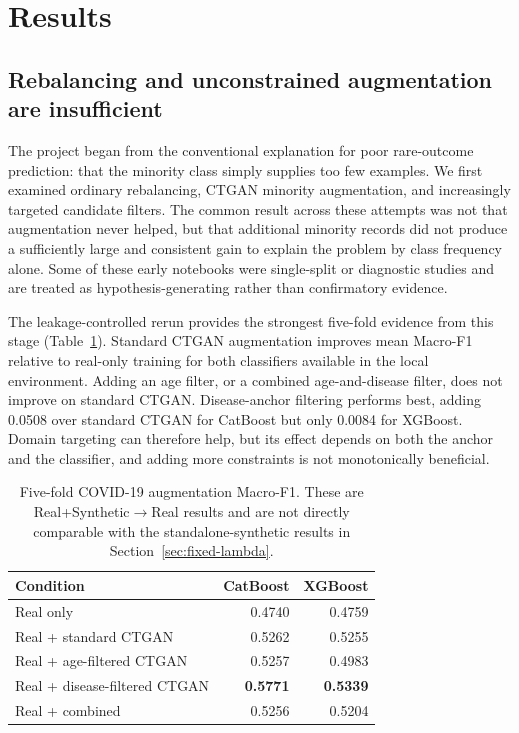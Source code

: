 \section{Results}
\label{sec:results}

\subsection{Rebalancing and unconstrained augmentation are insufficient}
\label{sec:dacpf-results}

The project began from the conventional explanation for poor rare-outcome prediction: that the minority class simply supplies too few examples. We first examined ordinary rebalancing, CTGAN minority augmentation, and increasingly targeted candidate filters. The common result across these attempts was not that augmentation never helped, but that additional minority records did not produce a sufficiently large and consistent gain to explain the problem by class frequency alone. Some of these early notebooks were single-split or diagnostic studies and are treated as hypothesis-generating rather than confirmatory evidence.

The leakage-controlled \dacpf{} rerun provides the strongest five-fold evidence from this stage (Table~\ref{tab:dacpf}). Standard CTGAN augmentation improves mean Macro-F1 relative to real-only training for both classifiers available in the local environment. Adding an age filter, or a combined age-and-disease filter, does not improve on standard CTGAN. Disease-anchor filtering performs best, adding 0.0508 over standard CTGAN for CatBoost but only 0.0084 for XGBoost. Domain targeting can therefore help, but its effect depends on both the anchor and the classifier, and adding more constraints is not monotonically beneficial.

\begin{table}[htbp]
\centering
\caption{Five-fold COVID-19 augmentation Macro-F1. These are Real+Synthetic$\rightarrow$Real results and are not directly comparable with the standalone-synthetic \tstr{} results in Section~\ref{sec:fixed-lambda}.}
\label{tab:dacpf}
\begin{tabular}{lrr}
\toprule
Condition & CatBoost & XGBoost\\
\midrule
Real only & 0.4740 & 0.4759\\
Real + standard CTGAN & 0.5262 & 0.5255\\
Real + age-filtered CTGAN & 0.5257 & 0.4983\\
Real + disease-filtered CTGAN & \textbf{0.5771} & \textbf{0.5339}\\
Real + combined \dacpf{} & 0.5256 & 0.5204\\
\bottomrule
\end{tabular}
\end{table}

